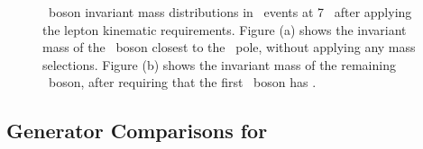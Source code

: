 \begin{figure}
\centering
        \vspace{-5mm}
        \vspace{-2mm}
    \caption[\Z\ boson invariant mass distributions in \ZZllll\ events at
    7 \tev\ after
    applying the lepton kinematic requirements.]{\small \Z\ boson invariant mass distributions in \ZZllll\ events at
    7 \tev\ after
    applying the lepton kinematic requirements. Figure (a) shows the invariant
    mass of the \Z\ boson closest to the \Z\ pole, without applying any mass
    selections. Figure (b) shows the invariant
    mass of the remaining \Z\ boson, after requiring that the first \Z\ boson
    has \sstooos. }
    \label{fig:gen-mZ}
\end{figure}

\subsection{Generator Comparisons for \ZZllll}
\label{sec:gen-comparisons}

